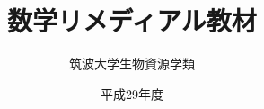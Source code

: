 \documentclass[twocolumn,9.5pt,fleqn,dvipdfmx]{jsbook}
\begin{document}
\title {{\Huge 数学リメディアル教材}\\ }
\author{{\Large 筑波大学生物資源学類}\\ }
\date{{\Large 平成29年度}}
\maketitle
\newpage

\frontmatter

\tableofcontents
\mainmatter









%






%
%















\printindex
\end{document}
